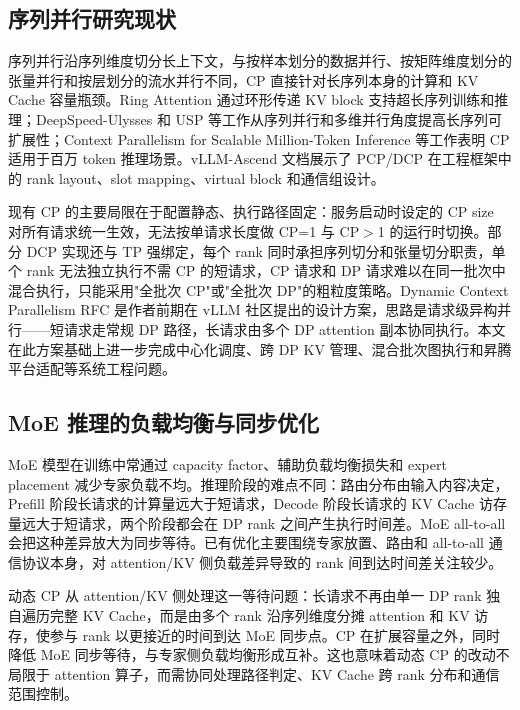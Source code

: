 \subsection{序列并行研究现状}

序列并行沿序列维度切分长上下文，与按样本划分的数据并行、按矩阵维度划分的张量并行和按层划分的流水并行不同，CP 直接针对长序列本身的计算和 KV Cache 容量瓶颈。Ring Attention 通过环形传递 KV block 支持超长序列训练和推理\citep{liu2023ringattention}；DeepSpeed-Ulysses 和 USP 等工作从序列并行和多维并行角度提高长序列可扩展性\citep{jacobs2023deepspeedulysses,fang2024usp}；Context Parallelism for Scalable Million-Token Inference 等工作表明 CP 适用于百万 token 推理场景\citep{zhong2024contextparallelism}。vLLM-Ascend 文档展示了 PCP/DCP 在工程框架中的 rank layout、slot mapping、virtual block 和通信组设计\citep{vllmascendcp2026}。

现有 CP 的主要局限在于配置静态、执行路径固定：服务启动时设定的 CP size 对所有请求统一生效，无法按单请求长度做 CP=1 与 CP$>$1 的运行时切换。部分 DCP 实现还与 TP 强绑定，每个 rank 同时承担序列切分和张量切分职责，单个 rank 无法独立执行不需 CP 的短请求，CP 请求和 DP 请求难以在同一批次中混合执行，只能采用"全批次 CP"或"全批次 DP"的粗粒度策略。Dynamic Context Parallelism RFC 是作者前期在 vLLM 社区提出的设计方案\citep{vllmdynamiccp2025}，思路是请求级异构并行——短请求走常规 DP 路径，长请求由多个 DP attention 副本协同执行。本文在此方案基础上进一步完成中心化调度、跨 DP KV 管理、混合批次图执行和昇腾平台适配等系统工程问题。

\subsection{MoE 推理的负载均衡与同步优化}

MoE 模型在训练中常通过 capacity factor、辅助负载均衡损失和 expert placement 减少专家负载不均\citep{lepikhin2020gshard,fedus2021switch}。推理阶段的难点不同：路由分布由输入内容决定，Prefill 阶段长请求的计算量远大于短请求，Decode 阶段长请求的 KV Cache 访存量远大于短请求，两个阶段都会在 DP rank 之间产生执行时间差。MoE all-to-all 会把这种差异放大为同步等待。已有优化主要围绕专家放置、路由和 all-to-all 通信协议本身，对 attention/KV 侧负载差异导致的 rank 间到达时间差关注较少。

动态 CP 从 attention/KV 侧处理这一等待问题：长请求不再由单一 DP rank 独自遍历完整 KV Cache，而是由多个 rank 沿序列维度分摊 attention 和 KV 访存，使参与 rank 以更接近的时间到达 MoE 同步点。CP 在扩展容量之外，同时降低 MoE 同步等待，与专家侧负载均衡形成互补。这也意味着动态 CP 的改动不局限于 attention 算子，而需协同处理路径判定、KV Cache 跨 rank 分布和通信范围控制。

